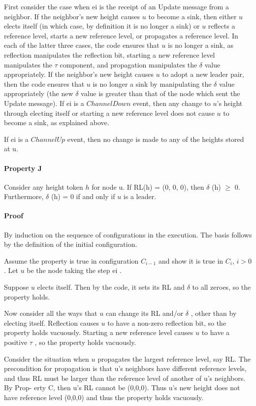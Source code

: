 First consider the case when ei is the receipt of an Update message from a neighbor. If the neighbor’s new height causes $u$ to become a sink, then either $u$ elects itself (in which case, by definition it is no longer a sink) or $u$ reflects a reference level, starts a new reference level, or propagates a reference level. In each of the latter three cases, the code ensures that $u$ is no longer a sink, as reflection manipulates the reflection bit, starting a new reference level manipulates the $\tau$ component, and propagation manipulates the $\delta$ value appropriately. If the neighbor’s new height causes $u$ to adopt a new leader pair, then the code ensures that $u$ is no longer a sink by manipulating the $\delta$ value appropriately (the new $\delta$ value is greater than that of the node which sent the Update message). If ei is a $ChannelDown$ event, then any change to $u$’s height through electing itself or starting a new reference level does not cause $u$ to become a sink, as explained above.

If ei is a $ChannelUp$ event, then no change is made to any of the heights stored at u.

\paragraph{Property J}Consider any height token $h$ for node u. If RL(h) = (0, 0, 0), then $\delta$ (h) $\geq$ 0. Furthermore, $\delta$ (h) = 0 if and only if $u$ is a leader.

\paragraph{Proof}By induction on the sequence of configurations in the execution. The basis follows by the definition of the initial configuration.

Assume the property is true in configuration $C_{i-1}$ and show it is true in $C_i$, $i > 0$. Let $u$ be the node taking the step ei .

Suppose $u$ elects itself. Then by the code, it sets its RL and $\delta$ to all zeroes, so the property holds.

Now consider all the ways that $u$ can change its RL and/or $\delta$ , other than by electing itself. Reflection causes $u$ to have a non-zero reflection bit, so the property holds vacuously. Starting a new reference level causes $u$ to have a positive $\tau$ , so the property holds vacuously.

Consider the situation when $u$ propagates the largest reference level, say RL. The precondition for propagation is that u’s neighbors have different reference levels, and thus RL must be larger than the reference level of another of u’s neighbors. By Prop- erty C, then u’s RL cannot be (0,0,0). Thus u’s new height does not have reference level (0,0,0) and thus the property holds vacuously.

